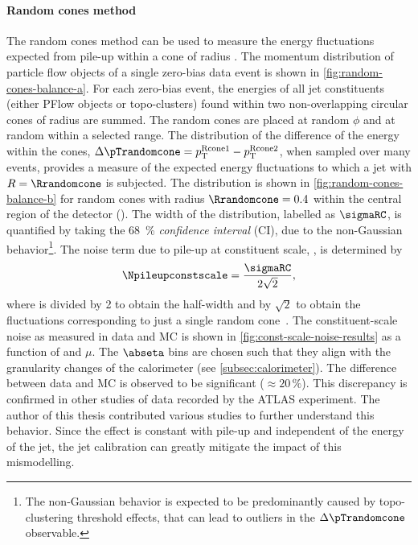\paragraph{Random cones method} The random cones method can be used to measure the energy fluctuations expected from pile-up within a cone of radius \Rrandomcone. The momentum distribution of particle flow objects of a single zero-bias data event is shown in \cref{fig:random-cones-balance-a}.
For each zero-bias event, the energies of all jet constituents (either PFlow objects or topo-clusters) found within two non-overlapping circular cones of radius \Rrandomcone are summed.
The random cones are placed at random $\phi$ and at random \abseta within a selected range.
The distribution of the difference of the energy within the cones, $\Delta \pTrandomcone = p_{\text{T}}^{\text{Rcone1}} - p_{\text{T}}^\text{Rcone2}$, when sampled over many events, provides a measure of the expected energy fluctuations to which a jet with $R = \Rrandomcone$ is subjected.
The distribution is shown in \cref{fig:random-cones-balance-b} for random cones with radius $\Rrandomcone = 0.4$ within the central region of the detector (). The width of the distribution, labelled as $\sigmaRC$, is quantified by taking the \SI{68}{\percent} \emph{confidence interval} (CI), due to the non-Gaussian behavior\footnote{The non-Gaussian behavior is expected to be predominantly caused by topo-clustering threshold effects, that can lead to outliers in the $\Delta \pTrandomcone$ observable.}.
The noise term due to pile-up at constituent scale, \Npileupconstscale, is determined by
\begin{equation}
    \Npileupconstscale = \frac{\sigmaRC}{2\sqrt{2}},
\end{equation}
where \sigmaRC is divided by 2 to obtain the half-width and by $\sqrt{2}$ to obtain the fluctuations corresponding to just a single random cone~\cite{JETM-2018-05}.
The constituent-scale noise as measured in data and MC is shown in \cref{fig:const-scale-noise-results} as a function of \abseta and $\mu$.
The $\abseta$ bins are chosen such that they align with the granularity changes of the calorimeter (see \cref{subsec:calorimeter}). 
The difference between data and MC is observed to be significant ($\approx 20\,\%$). This discrepancy is confirmed in other studies of data recorded by the ATLAS experiment. The author of this thesis contributed various studies to further understand this behavior.
Since the effect is constant with pile-up and independent of the energy of the jet, the jet calibration can greatly mitigate the impact of this mismodelling.

